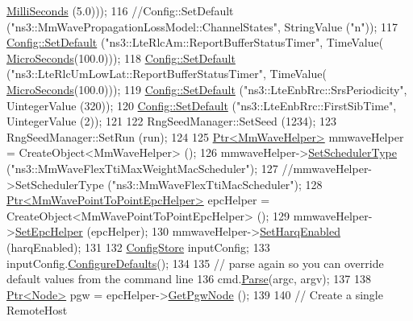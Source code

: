 \begin{DoxyCode}
      \hyperlink{group__timecivil_gaf26127cf4571146b83a92ee18679c7a9}{MilliSeconds} (5.0)));
116         \textcolor{comment}{//Config::SetDefault ("ns3::MmWavePropagationLossModel::ChannelStates", StringValue ("n"));}
117         \hyperlink{group__config_ga2e7882df849d8ba4aaad31c934c40c06}{Config::SetDefault} (\textcolor{stringliteral}{"ns3::LteRlcAm::ReportBufferStatusTimer"}, TimeValue(
      \hyperlink{group__timecivil_ga17465a639c8d1464e76538afdd78a9f0}{MicroSeconds}(100.0)));
118         \hyperlink{group__config_ga2e7882df849d8ba4aaad31c934c40c06}{Config::SetDefault} (\textcolor{stringliteral}{"ns3::LteRlcUmLowLat::ReportBufferStatusTimer"}, TimeValue(
      \hyperlink{group__timecivil_ga17465a639c8d1464e76538afdd78a9f0}{MicroSeconds}(100.0)));
119         \hyperlink{group__config_ga2e7882df849d8ba4aaad31c934c40c06}{Config::SetDefault} (\textcolor{stringliteral}{"ns3::LteEnbRrc::SrsPeriodicity"}, UintegerValue (320));
120         \hyperlink{group__config_ga2e7882df849d8ba4aaad31c934c40c06}{Config::SetDefault} (\textcolor{stringliteral}{"ns3::LteEnbRrc::FirstSibTime"}, UintegerValue (2));
121 
122         RngSeedManager::SetSeed (1234);
123         RngSeedManager::SetRun (run);
124 
125         \hyperlink{classns3_1_1Ptr}{Ptr<MmWaveHelper>} mmwaveHelper = CreateObject<MmWaveHelper> ();
126         mmwaveHelper->\hyperlink{classns3_1_1MmWaveHelper_ae38f5e96d749ab63dda7746f43dfbe84}{SetSchedulerType} (\textcolor{stringliteral}{"ns3::MmWaveFlexTtiMaxWeightMacScheduler"});
127         \textcolor{comment}{//mmwaveHelper->SetSchedulerType ("ns3::MmWaveFlexTtiMacScheduler");}
128         \hyperlink{classns3_1_1Ptr}{Ptr<MmWavePointToPointEpcHelper>}  epcHelper = 
      CreateObject<MmWavePointToPointEpcHelper> ();
129         mmwaveHelper->\hyperlink{classns3_1_1MmWaveHelper_a54fc98a649a710153b479d0878558733}{SetEpcHelper} (epcHelper);
130         mmwaveHelper->\hyperlink{classns3_1_1MmWaveHelper_af211a02952ab5f4eabe0219cf53e7e1c}{SetHarqEnabled} (harqEnabled);
131 
132         \hyperlink{classns3_1_1ConfigStore}{ConfigStore} inputConfig;
133         inputConfig.\hyperlink{classns3_1_1ConfigStore_a0a6137574d7c847c3823af8b9d1bb886}{ConfigureDefaults}();
134 
135         \textcolor{comment}{// parse again so you can override default values from the command line}
136         cmd.\hyperlink{classns3_1_1CommandLine_a5c10b85b3207e5ecb48d907966923156}{Parse}(argc, argv);
137 
138         \hyperlink{classns3_1_1Ptr}{Ptr<Node>} pgw = epcHelper->\hyperlink{classns3_1_1MmWavePointToPointEpcHelper_a586f072ee5b09376531ba605b3fed05f}{GetPgwNode} ();
139 
140         \textcolor{comment}{// Create a single RemoteHost}

\end{DoxyCode}
